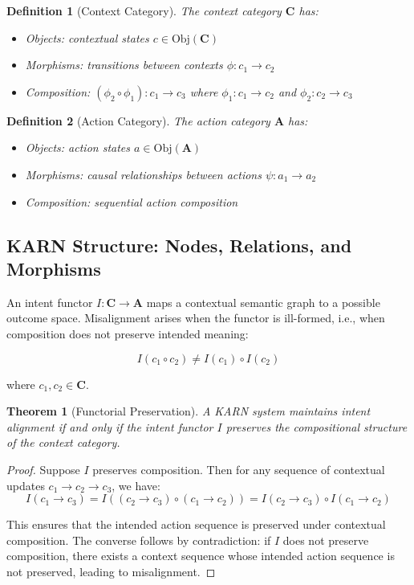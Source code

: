 \documentclass[12pt]{article}
\newtheorem{definition}{Definition}
\newtheorem{theorem}{Theorem}
\begin{document}
\begin{definition}[Context Category]
The context category $\mathbf{C}$ has:
\begin{itemize}
\item Objects: contextual states $c \in \text{Obj}(\mathbf{C})$
\item Morphisms: transitions between contexts $\phi: c_1 \rightarrow c_2$
\item Composition: $(\phi_2 \circ \phi_1): c_1 \rightarrow c_3$ where $\phi_1: c_1 \rightarrow c_2$ and $\phi_2: c_2 \rightarrow c_3$
\end{itemize}
\end{definition}

\begin{definition}[Action Category]
The action category $\mathbf{A}$ has:
\begin{itemize}
\item Objects: action states $a \in \text{Obj}(\mathbf{A})$
\item Morphisms: causal relationships between actions $\psi: a_1 \rightarrow a_2$
\item Composition: sequential action composition
\end{itemize}
\end{definition}

\subsection{KARN Structure: Nodes, Relations, and Morphisms}

An intent functor $I: \mathbf{C} \rightarrow \mathbf{A}$ maps a contextual semantic graph to a possible outcome space. Misalignment arises when the functor is ill-formed, i.e., when composition does not preserve intended meaning:

$$I(c_1 \circ c_2) \neq I(c_1) \circ I(c_2)$$

where $c_1, c_2 \in \mathbf{C}$.

\begin{theorem}[Functorial Preservation]
A KARN system maintains intent alignment if and only if the intent functor $I$ preserves the compositional structure of the context category.
\end{theorem}

\begin{proof}
Suppose $I$ preserves composition. Then for any sequence of contextual updates $c_1 \rightarrow c_2 \rightarrow c_3$, we have:
$$I(c_1 \rightarrow c_3) = I((c_2 \rightarrow c_3) \circ (c_1 \rightarrow c_2)) = I(c_2 \rightarrow c_3) \circ I(c_1 \rightarrow c_2)$$

This ensures that the intended action sequence is preserved under contextual composition. The converse follows by contradiction: if $I$ does not preserve composition, there exists a context sequence whose intended action sequence is not preserved, leading to misalignment.
\end{proof}
\end{document}
